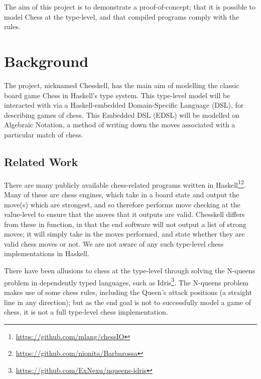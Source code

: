\documentclass[12pt, a4paper]{scrartcl}
\begin{document}
The aim of this project is to demonstrate a proof-of-concept; that it is possible to model Chess at the type-level, and that compiled programs comply with the rules.

\section{Background}

The project, nicknamed Chesskell, has the main aim of modelling the classic board game Chess in Haskell's type system. This type-level model will be interacted with via a Haskell-embedded Domain-Specific Language (DSL), for describing games of chess. This Embedded DSL (EDSL) will be modelled on Algebraic Notation, a method of writing down the moves associated with a particular match of chess.



\subsection{Related Work}

There are many publicly available chess-related programs written in Haskell\footnote{\url{https://github.com/mlang/chessIO}}\footnote{\url{https://github.com/nionita/Barbarossa}}. Many of these are chess engines, which take in a board state and output the move(s) which are strongest, and so therefore performs move checking at the value-level to ensure that the moves that it outputs are valid. Chesskell differs from these in function, in that the end software will not output a list of strong moves; it will simply take in the moves performed, and state whether they are valid chess moves or not. We are not aware of any such type-level chess implementations in Haskell.

There have been allusions to chess at the type-level through solving the N-queens problem in dependently typed languages, such as Idris\footnote{\url{https://github.com/ExNexu/nqueens-idris}}\cite{idrisnqueens}. The N-queens problem makes use of some chess rules, including the Queen's attack positions (a straight line in any direction); but as the end goal is not to successfully model a game of chess, it is not a full type-level chess implementation.
\end{document}
